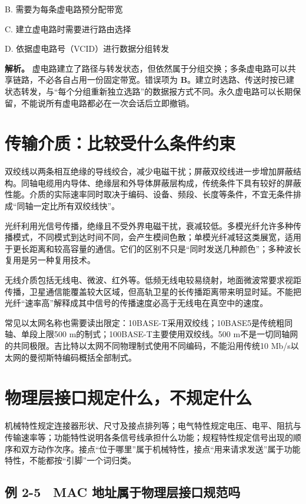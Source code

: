B. 需要为每条虚电路预分配带宽

C. 建立虚电路时需要进行路由选择

D. 依据虚电路号（VCID）进行数据分组转发


\textbf{解析。} 虚电路建立了路径与转发状态，但依然属于分组交换；多条虚电路可以共享链路，不必各自占用一份固定带宽。错误项为 \textbf{B}。建立时选路、传送时按已建状态转发，与``每个分组重新独立选路''的数据报方式不同。永久虚电路可以长期保留，不能说所有虚电路都必在一次会话后立即撤销。

\section{传输介质：比较受什么条件约束}\label{cn-02-06}

双绞线以两条相互绝缘的导线绞合，减少电磁干扰；屏蔽双绞线进一步增加屏蔽结构。同轴电缆用内导体、绝缘层和外导体屏蔽层构成，传统条件下具有较好的屏蔽性能。介质的实际速率同时取决于编码、设备、频段、长度等条件，不宜无条件排成``同轴一定比所有双绞线快''。

光纤利用光信号传播，绝缘且不受外界电磁干扰，衰减较低。多模光纤允许多种传播模式，不同模式到达时间不同，会产生模间色散；单模光纤减轻这类展宽，适用于更长距离和较高容量的通信。它们的区别不只是``同时发送几种颜色''；多种波长复用是另一种复用技术。

无线介质包括无线电、微波、红外等。低频无线电较易绕射，地面微波常要求视距传播，卫星通信能覆盖较大区域，但高轨卫星的长传播距离带来明显时延。不能把光纤``速率高''解释成其中信号的传播速度必高于无线电在真空中的速度。

常见以太网名称也需要读出限定：10BASE-T采用双绞线；10BASE5是传统粗同轴、单段上限500 m的制式；100BASE-T主要使用双绞线。500 m不是一切同轴网的共同极限。吉比特以太网不同物理制式使用不同编码，不能沿用传统10 Mb/s以太网的曼彻斯特编码概括全部制式。

\section{物理层接口规定什么，不规定什么}\label{cn-02-07}

机械特性规定连接器形状、尺寸及接点排列等；电气特性规定电压、电平、阻抗与传输速率等；功能特性说明各条信号线承担什么功能；规程特性规定信号出现的顺序和双方动作次序。接点``位于哪里''属于机械特性，接点``用来请求发送''属于功能特性，不能都按``引脚''一个词归类。

\subsection{例 2-5　MAC 地址属于物理层接口规范吗}\label{cn-ex2-5}

